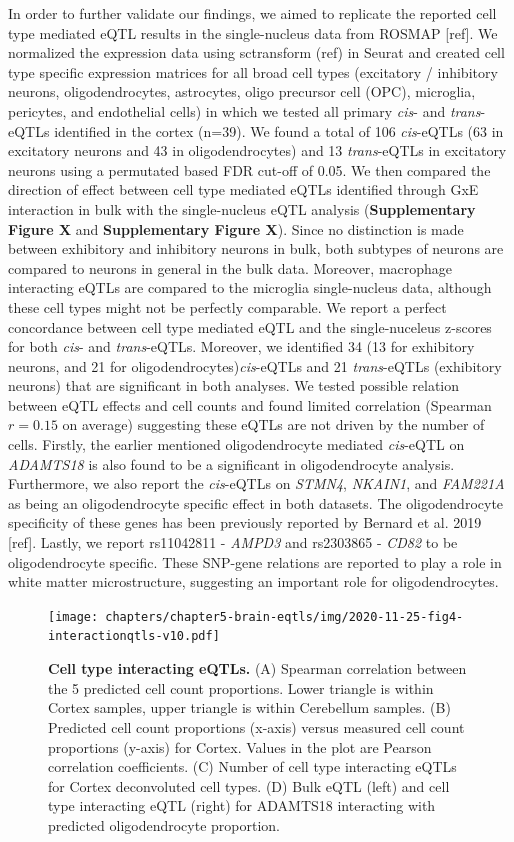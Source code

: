 {{In order to further validate our findings, we aimed to replicate the reported cell type mediated eQTL results in the single-nucleus data from ROSMAP [ref]. We normalized the expression data using sctransform (ref) in Seurat and created cell type specific expression matrices for all broad cell types (excitatory / inhibitory neurons, oligodendrocytes, astrocytes, oligo precursor cell (OPC), microglia, pericytes, and endothelial cells) in which we tested all primary \emph{cis}- and \emph{trans}-eQTLs identified in the cortex (n=39). We found a total of 106 \emph{cis}-eQTLs (63 in excitatory neurons and 43 in oligodendrocytes) and 13 \emph{trans}-eQTLs in excitatory neurons using a permutated based FDR cut-off of 0.05. We then compared the direction of effect between cell type mediated eQTLs identified through GxE interaction in bulk with the single-nucleus eQTL analysis (\textbf{Supplementary Figure X} and \textbf{Supplementary Figure X}). Since no distinction is made between exhibitory and inhibitory neurons in bulk, both subtypes of neurons are compared to neurons in general in the bulk data. Moreover, macrophage interacting eQTLs are compared to the microglia single-nucleus data, although these cell types might not be perfectly comparable. We report a perfect concordance between cell type mediated eQTL and the single-nuceleus z-scores for both \emph{cis}- and \emph{trans}-eQTLs. Moreover, we identified 34 (13 for exhibitory neurons, and 21 for oligodendrocytes)\emph{cis}-eQTLs and 21 \emph{trans}-eQTLs (exhibitory neurons) that are significant in both analyses. We tested possible relation between eQTL effects and cell counts and found limited correlation (Spearman $r = 0.15$ on average) suggesting these eQTLs are not driven by the number of cells. Firstly, the earlier mentioned oligodendrocyte mediated \emph{cis}-eQTL on \emph{ADAMTS18} is also found to be a significant in oligodendrocyte analysis. Furthermore, we also report the \emph{cis}-eQTLs on \emph{STMN4}, \emph{NKAIN1}, and \emph{FAM221A} as being an oligodendrocyte specific effect in both datasets. The oligodendrocyte specificity of these genes has been previously reported by Bernard et al. 2019 [ref]. Lastly, we report rs11042811 - \emph{AMPD3} and rs2303865 - \emph{CD82} to be oligodendrocyte specific. These SNP-gene relations are reported to play a role in white matter microstructure, suggesting an important role for oligodendrocytes.

\begin{figure}[H]
	\texttt{[image: chapters/chapter5-brain-eqtls/img/2020-11-25-fig4-interactionqtls-v10.pdf]}
	\caption{\textbf{Cell type interacting eQTLs.} (A) Spearman correlation between the 5 predicted cell count proportions. Lower triangle is within Cortex samples, upper triangle is within Cerebellum samples. (B) Predicted cell count proportions (x-axis) versus measured cell count proportions (y-axis) for Cortex. Values in the plot are Pearson correlation coefficients. (C) Number of cell type interacting eQTLs for Cortex deconvoluted cell types. (D) Bulk eQTL (left) and cell type interacting eQTL (right) for ADAMTS18 interacting with predicted oligodendrocyte proportion.}
	\end{figure}

}}
